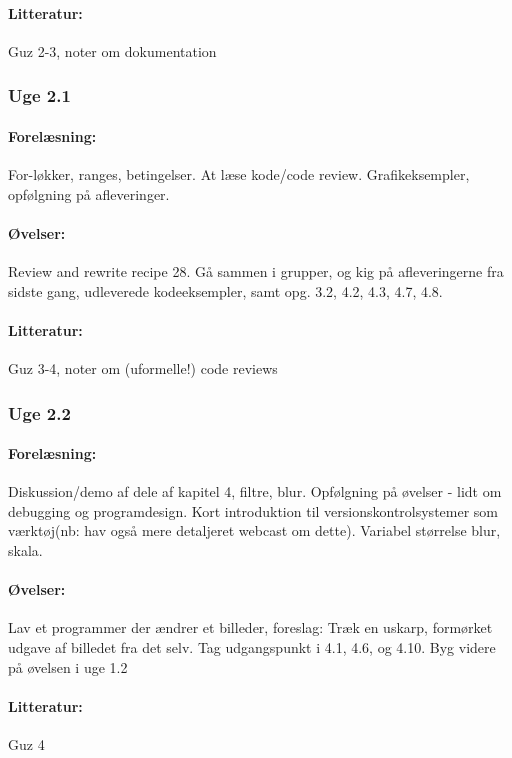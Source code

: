 \documentclass[12pt]{article}
\begin{document}
\paragraph{Litteratur:} Guz 2-3, noter om dokumentation

\subsubsection{Uge 2.1}
\paragraph{Forelæsning:} 
For-løkker, ranges, betingelser.
At læse kode/code review. 
Grafikeksempler, opfølgning på afleveringer.

\paragraph{Øvelser:} 
Review and rewrite recipe 28.
Gå sammen i grupper, og kig på afleveringerne fra sidste gang, udleverede kodeeksempler, samt opg. 3.2, 4.2, 4.3, 4.7, 4.8.


\paragraph{Litteratur:} Guz 3-4, noter om (uformelle!) code reviews

\subsubsection{Uge 2.2}
\paragraph{Forelæsning:} 

Diskussion/demo af dele af kapitel 4, filtre, blur.
Opfølgning på øvelser -  lidt om debugging og programdesign.
Kort introduktion til versionskontrolsystemer som værktøj(nb: hav også mere detaljeret webcast om dette).
Variabel størrelse blur, skala.

\paragraph{Øvelser:}
Lav et programmer der ændrer et billeder, foreslag:
Træk en uskarp, formørket udgave af billedet fra det selv. 
Tag udgangspunkt i 4.1, 4.6, og 4.10.
Byg videre på øvelsen i uge 1.2

\paragraph{Litteratur:} Guz 4
\end{document}
